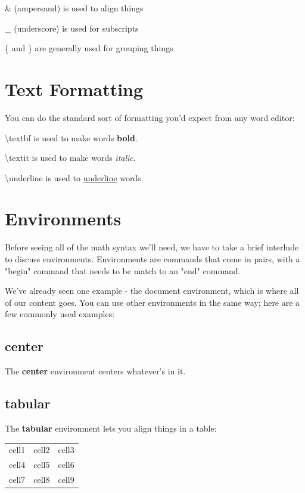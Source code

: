 \documentclass{article}
\begin{document}
    \& (ampersand) is used to align things
    
    \_ (underscore) is used for subscripts 
    
    \{ and \} are generally used for grouping things


\section{Text Formatting}
    You can do the standard sort of formatting you'd expect from any word editor:
    
    \textbackslash textbf{} is used to make words \textbf{bold}.
    
    \textbackslash textit{} is used to make words \textit{italic}.
    
    \textbackslash underline{} is used to \underline{underline} words.


\section{Environments}
    Before seeing all of the math syntax we'll need, we have to take a brief interlude to discuss environments. Environments are commands that come in pairs, with a "begin" command that needs to be match to an "end" command.
    
    We've already seen one example - the document environment, which is where all of our content goes. You can use other environments in the same way; here are a few commonly used examples:

    \subsection{center}
        \begin{center}
            The \textbf{center} environment centers whatever's in it.
        \end{center}
        
        \subsection{tabular}
        The \textbf{tabular} environment lets you align things in a table:
        \begin{tabular}{ c c c } 
          cell1 & cell2 & cell3 \\ 
          cell4 & cell5 & cell6 \\ 
          cell7 & cell8 & cell9 \\ 
        \end{tabular}
\end{document}
